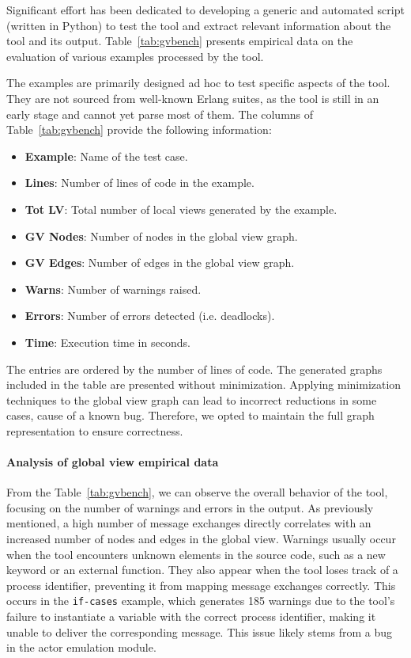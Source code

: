 Significant effort has been dedicated to developing a 
generic and automated script (written in Python) to test the tool and extract 
relevant information about the tool and its output.
Table~\ref{tab:gvbench} presents empirical data on the evaluation of various 
examples processed by the tool. 

The examples are primarily designed ad hoc to test specific aspects of the tool.
They are not sourced from well-known Erlang suites, as the tool is still in an
early stage and cannot yet parse most of them.
The columns of Table~\ref{tab:gvbench} provide the following information:

\begin{itemize}
    \item \textbf{Example}: Name of the test case.
    \item \textbf{Lines}: Number of lines of code in the example.
    \item \textbf{Tot LV}: Total number of local views generated by the example.
    \item \textbf{GV Nodes}: Number of nodes in the global view graph.
    \item \textbf{GV Edges}: Number of edges in the global view graph.
    \item \textbf{Warns}: Number of warnings raised.
    \item \textbf{Errors}: Number of errors detected (i.e. deadlocks).
    \item \textbf{Time}: Execution time in seconds.
\end{itemize}

The entries are ordered by the number of lines of code. The generated graphs 
included in the table are presented without minimization. Applying minimization 
techniques to the global view graph can lead to incorrect reductions in some 
cases, cause of a known bug. Therefore, we opted to maintain the full 
graph representation to ensure correctness.

\paragraph{Analysis of global view empirical data}
From the Table~\ref{tab:gvbench}, we can observe the overall behavior of the tool, 
focusing on the number of warnings and errors in the output. 
As previously mentioned, a high number of message exchanges directly correlates  
with an increased number of nodes and edges in the global view.
Warnings usually occur when the
tool encounters unknown elements in the source code, such as a new keyword or
an external function. They also appear when the tool loses track of a process
identifier, preventing it from mapping message exchanges correctly. 
This occurs in the \texttt{if-cases} example, which generates 185 warnings due to
the tool's failure to instantiate a variable with the correct process identifier,
making it unable to deliver the corresponding message. This issue likely stems 
from a bug in the actor emulation module.


